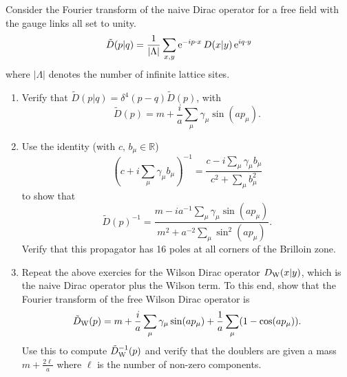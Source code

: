Consider the Fourier transform of the naive Dirac operator for a free field with the gauge links all set to unity.
\begin{equation}
	\tilde{D}(p|q) = \frac{1}{|\Lambda|} \sum_{x,y} {\rm e}^{-ip\cdot x} \, D(x|y) \, {\rm e}^{iq\cdot y}
\end{equation}
where $|\Lambda|$ denotes the number of infinite lattice sites.

\begin{enumerate}
	\item Verify that $\tilde{D}(p|q) = \delta^4(p-q) \tilde{D}(p)$, with
	      \begin{equation}
		      \tilde{D}(p) = m + \frac{i}{a} \sum_{\mu} \gamma_\mu \sin(ap_\mu).
	      \end{equation}
	\item Use the identity (with $c,\, b_{\mu} \in \mathbb{R}$)
	      \begin{equation}
		      \left( c + i\sum_{\mu} \gamma_\mu b_\mu \right)^{-1} = \frac{c - i\sum_\mu \gamma_\mu b_{\mu}}{c^2 + \sum_\mu b_\mu^2}
	      \end{equation}
	      to show that
	      \begin{equation}
		      \tilde{D}(p)^{-1} = \frac{m - ia^{-1}\sum_{\mu} \gamma_\mu \sin(ap_{\mu})}{m^2 + a^{-2}\sum_\mu \sin^{2}(ap_{\mu})}.
	      \end{equation}
	      Verify that this propagator has 16 poles at all corners of the Brilloin zone.
	\item Repeat the above exercies for the Wilson Dirac operator $D_{\rm W}(x|y)$, which is the naive Dirac operator plus the Wilson term. To this end, show that the Fourier transform of the free Wilson Dirac operator is
	      \begin{equation}
		      \tilde{D}_{\rm W}(p) = m + \frac{i}{a}\sum_{\mu} \gamma_{\mu}\sin(ap_\mu) +
		      \frac{1}{a} \sum_{\mu} (1 - \cos(ap_\mu)).
	      \end{equation}
	      Use this to compute $\tilde{D}_{\rm W}^{-1}(p)$ and verify that the doublers are given a mass $m + \frac{2\ell}{a}$ where $\ell$ is the number of non-zero components.
\end{enumerate}
